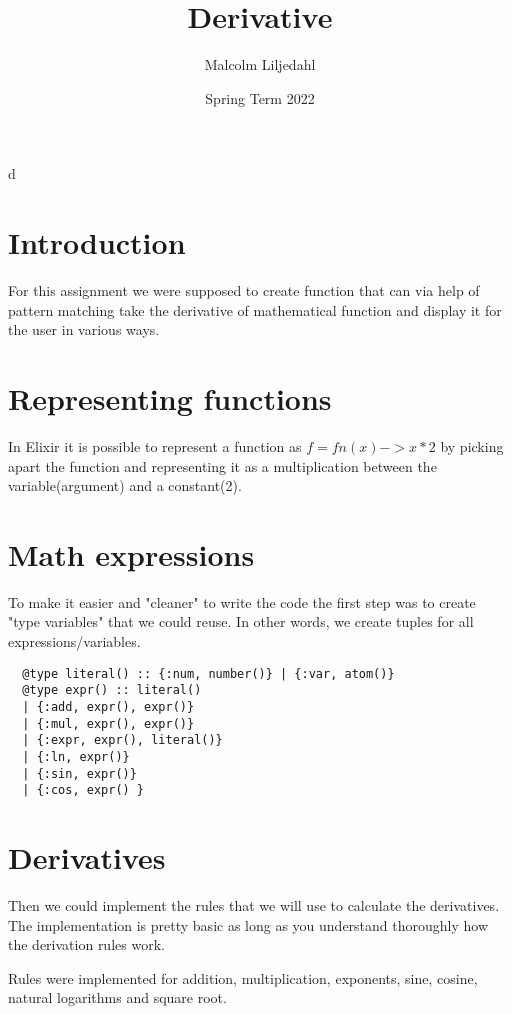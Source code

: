 d\documentclass[a4paper,11pt]{article}
\begin{document}
\title{
    \textbf{Derivative}
}
\author{Malcolm Liljedahl}
\date{Spring Term 2022}

\maketitle

\section*{Introduction}

For this assignment we were supposed to create function that can via help of pattern matching take the derivative of mathematical function and display it for the user in various ways.

\section{Representing functions}

In Elixir it is possible to represent a function as  $f = fn(x) -> x * 2 $ by picking apart the function and representing it as a multiplication between the variable(argument) and a constant(2).

\section{Math expressions}

To make it easier and "cleaner" to write the code the first step was to create "type variables" that we could reuse. In other words, we create tuples for all expressions/variables.

\begin{verbatim}
  @type literal() :: {:num, number()} | {:var, atom()}
  @type expr() :: literal()
  | {:add, expr(), expr()}
  | {:mul, expr(), expr()}
  | {:expr, expr(), literal()}
  | {:ln, expr()}
  | {:sin, expr()}
  | {:cos, expr() }
\end{verbatim}

\section{Derivatives}
Then we could implement the rules that we will use to calculate the derivatives. The implementation is pretty basic as long as you understand thoroughly how the derivation rules work.

Rules were implemented for addition, multiplication, exponents, sine, cosine, natural logarithms and square root. 
\end{document}
